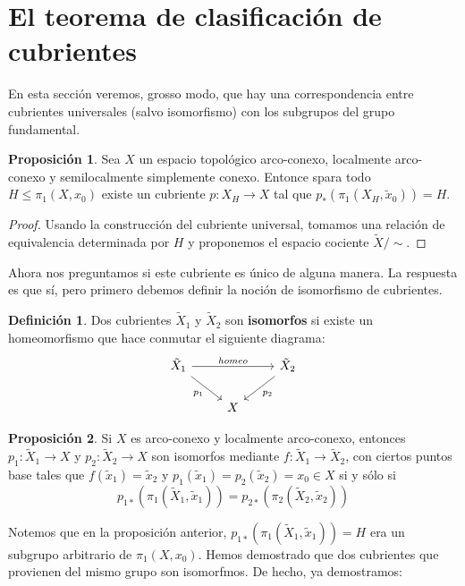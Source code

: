 \documentclass[spanish]{book}
\theoremstyle{definition}
\newtheorem*{defn}{Definición}
\newtheorem*{prop}{Proposición}
\begin{document}
\section{El teorema de clasificación de cubrientes}
En esta sección veremos, grosso modo, que hay una correspondencia entre cubrientes universales (salvo isomorfismo) con los subgrupos del grupo fundamental.

\begin{prop}
	Sea $X$ un espacio topológico arco-conexo, localmente arco-conexo y semilocalmente simplemente conexo. Entonce spara todo $H\leq\pi_1(X,x_0)$ existe un cubriente $p:X_H\to X$ tal que $p_{*}\left(\pi_1(X_H,\tilde{x}_0)\right)=H$.
\end{prop}
\begin{proof}
	Usando la construcción del cubriente universal, tomamos una relación de equivalencia determinada por $H$ y proponemos el espacio cociente $\tilde{X}/\sim{}$.
\end{proof}
Ahora nos preguntamos si este cubriente es único de alguna manera. La respuesta es que sí, pero primero debemos definir la noción de isomorfismo de cubrientes.
\begin{defn}
	Dos cubrientes $\tilde{X}_1$ y $\tilde{X}_2$ son \textbf{isomorfos} si existe un homeomorfismo que hace conmutar el siguiente diagrama:
	\[\begin{tikzcd}
		\tilde{X}_1\arrow[dr,swap,"p_1"]\arrow[rr,"homeo"]&&\tilde{X}_2\arrow[dl,"p_2"]\\
		&X
	\end{tikzcd}\]
\end{defn}
\begin{prop}
	Si $X$ es arco-conexo y localmente arco-conexo, entonces $p_1:\tilde{X}_1\to X$ y $p_2:\tilde{X}_2\to X$ son isomorfos mediante $f:\tilde{X}_1\to\tilde{X}_2$, con ciertos puntos base tales que $f(\tilde{x}_1)=\tilde{x}_2$ y $p_1(\tilde{x}_1)=p_2(\tilde{x}_2)=x_0\in X$ si y sólo si
	\[p_{1*}\left(\pi_1(\tilde{X}_1,\tilde{x}_1)\right)=p_{2*}\left(\pi_2(\tilde{X}_2,\tilde{x}_2)\right)\]
\end{prop}
Notemos que en la proposición anterior, $p_{1*}\left(\pi_1(\tilde{X}_1,\tilde{x}_1)\right)=H$ era un subgrupo arbitrario de $\pi_1(X,x_0)$. Hemos demostrado que dos cubrientes que provienen del mismo grupo son isomorfmos. De hecho, ya demostramos:
\end{document}
